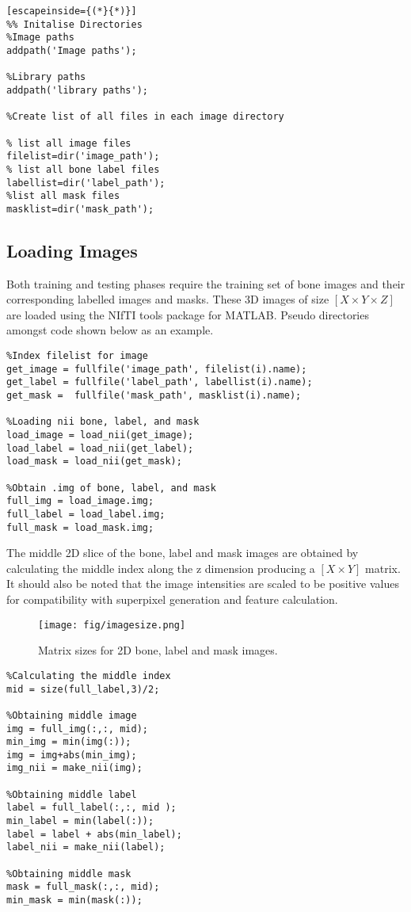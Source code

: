 \begin{lstlisting}[escapeinside={(*}{*)}]
%% Initalise Directories 
%Image paths
addpath('Image paths');

%Library paths
addpath('library paths');

%Create list of all files in each image directory

% list all image files
filelist=dir('image_path'); 
% list all bone label files
labellist=dir('label_path');
%list all mask files 
masklist=dir('mask_path'); 
\end{lstlisting}


\subsection{Loading Images} 
Both training and testing phases require the training set of bone images and their corresponding labelled images and masks. These 3D images of size $[X \times Y \times Z]$ are loaded using the NIfTI tools package \cite{ref:nifti_1} for MATLAB. Pseudo directories amongst code shown below as an example. 
\begin{lstlisting}
%Index filelist for image
get_image = fullfile('image_path', filelist(i).name);
get_label = fullfile('label_path', labellist(i).name);
get_mask =  fullfile('mask_path', masklist(i).name);
    
%Loading nii bone, label, and mask
load_image = load_nii(get_image);
load_label = load_nii(get_label);
load_mask = load_nii(get_mask); 

%Obtain .img of bone, label, and mask
full_img = load_image.img;
full_label = load_label.img;
full_mask = load_mask.img;
\end{lstlisting}

\bigskip
The middle 2D slice of the bone, label and mask images are obtained by calculating the middle index along the z dimension producing a $[X \times Y]$ matrix. It should also be noted that the image intensities are scaled to be positive values for compatibility with superpixel generation and feature calculation.

\begin{figure}[H]
\centering
\texttt{[image: fig/imagesize.png]}
\caption{Matrix sizes for 2D bone, label and mask images.}
\label{mat:image}
\end{figure}

\begin{lstlisting}
%Calculating the middle index
mid = size(full_label,3)/2;

%Obtaining middle image
img = full_img(:,:, mid);
min_img = min(img(:));
img = img+abs(min_img);
img_nii = make_nii(img);

%Obtaining middle label
label = full_label(:,:, mid );
min_label = min(label(:));
label = label + abs(min_label);
label_nii = make_nii(label);

%Obtaining middle mask
mask = full_mask(:,:, mid);
min_mask = min(mask(:));
\end{lstlisting}



